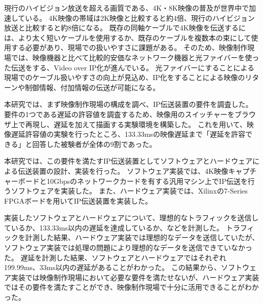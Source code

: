 
\begin{jabstract}

現行のハイビジョン放送を超える画質である、4K・8K映像の普及が世界中で加速している。
4K映像の帯域は2K映像と比較すると約4倍、現行のハイビジョン放送と比較すると約8倍になる。
既存の同軸ケーブルで4K映像を伝送するには、より太く短いケーブルを使用するか、既存のケーブルを複数本の束にして使用する必要があり、現場での扱いやすさに課題がある。
そのため、映像制作現場では、映像機器と比べて比較的安価なネットワーク機器と光ファイバーを使った伝送をする、Video over IP化が進んでいる。
光ファイバーにすることによる現場でのケーブル扱いやすさの向上が見込め、IP化をすることによる映像のリターンや制御情報、付加情報の伝送が可能になる。

本研究では、まず映像制作現場の構成を調べ、IP伝送装置の要件を調査した。
要件の1つである遅延の許容値を調査するため、映像用のスイッチャーをブラウザ上で再現し、遅延を加えて描画する実験環境を構築した。
これを用いて、映像遅延許容値の実験を行ったところ、133.33msの映像遅延まで「遅延を許容できる」と回答した被験者が全体の9割であった。

本研究では、この要件を満たすIP伝送装置としてソフトウェアとハードウェアによる伝送装置の設計、実装を行った。
ソフトウェア実装では、4K映像キャプチャーボードと10Gbpsのネットワークカードを有する汎用マシン上でIP伝送を行うソフトウェアを実装した。
また、ハードウェア実装では、Xilinxの7-Series FPGAボードを用いてIP伝送装置を実装した。

実装したソフトウェアとハードウェアについて、理想的なトラフィックを送信しているか、133.33ms以内の遅延を達成しているか、などを計測した。
トラフィックを計測した結果、ハードウェア実装では理想的なデータを送信していたが、ソフトウェア実装では処理の問題により理想的なデータを送信できていなかった。
遅延を計測した結果、ソフトウェアとハードウェアではそれぞれ199.99ms、33ms以内の遅延があることがわかった。
この結果から、ソフトウェア実装では映像制作現場において必要な要件を満たせないが、ハードウェア実装ではその要件を満たすことができ、映像制作現場で十分に活用できることがわかった。



\end{jabstract}
